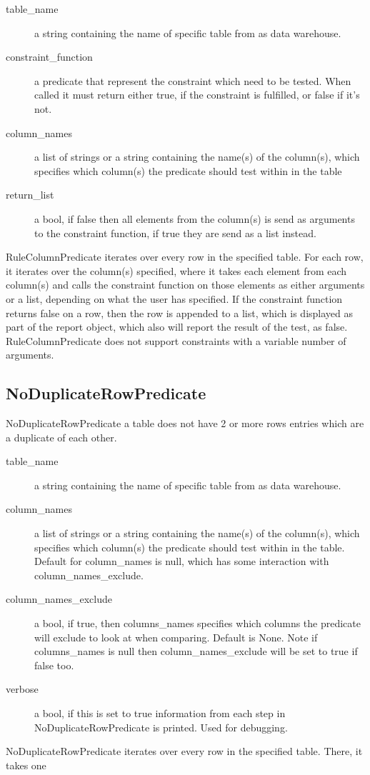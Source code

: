 
\begin{description}
\item [table\_name] a string containing the name of specific table from as data warehouse. 
\item [constraint\_function] a predicate that represent the constraint which need to be tested. When called it must return either true, if the constraint is fulfilled, or false if it's not.
\item [column\_names] a list of strings or a string containing the name(s) of the column(s), which specifies which column(s) the predicate should test within in the table
\item [return\_list] a bool, if false then all elements from the column(s) is send as arguments to the constraint function, if true they are send as a list instead.
\end{description}

RuleColumnPredicate iterates over every row in the specified table. For each row, it iterates over the column(s) specified, where it takes each element from each column(s) and calls the constraint function on those elements as either arguments or a list, depending on what the user has specified. If the constraint function returns false on a row, then the row is appended to a list, which is displayed as part of the report object, which also will report the result of the test, as false. RuleColumnPredicate does not support constraints with a variable number of arguments.

\subsection{NoDuplicateRowPredicate}

NoDuplicateRowPredicate a table does not have 2 or more rows entries which are a duplicate of each other. 


\begin{description}
\item [table\_name] a string containing the name of specific table from as data warehouse. 
\item [column\_names] a list of strings or a string containing the name(s) of the column(s), which specifies which column(s) the predicate should test within in the table. Default for column\_names is null, which has some interaction with column\_names\_exclude.
\item [column\_names\_exclude] a bool, if true, then columns\_names specifies which columns the predicate will exclude to look at when comparing. Default is None. Note if columns\_names is null then column\_names\_exclude will be set to true if false too.
\item [verbose] a bool, if this is set to true information from each step in NoDuplicateRowPredicate is printed. Used for debugging.
\end{description}

NoDuplicateRowPredicate iterates over every row in the specified table. There, it takes one 
